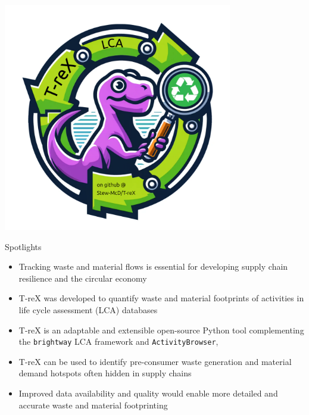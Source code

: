 \documentclass[review,3p,authoryear]{elsarticle}
\renewcommand{\texttt}[1]{{\ttfamily\small\nolinkurl{#1}}}
\begin{document}
\vspace{20m}
\includegraphics[width=10cm]{graphical-abstract.pdf}

\clearpage
\linenumbers{}


{\Large Spotlights}
\vspace{1em}
\begin{itemize}
    \item Tracking waste and material flows is essential for developing supply chain resilience and the circular economy
    \item T-reX was developed to quantify waste and material footprints of activities in life cycle assessment (LCA) databases
    \item T-reX is an adaptable and extensible open-source Python tool complementing the \texttt{brightway} LCA framework and \texttt{ActivityBrowser},
    \item T-reX can be used to identify pre-consumer waste generation and material demand hotspots often hidden in supply chains
    \item Improved data availability and quality would enable more detailed and accurate waste and material footprinting
\end{itemize}
\end{document}
